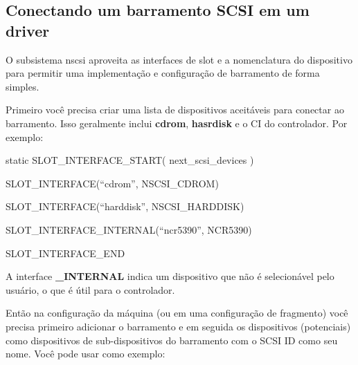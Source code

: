 \documentclass[letterpaper,10pt,brazil]{sphinxmanual}
\begin{document}
\subsection{Conectando um barramento SCSI em um driver}
\label{techspecs/nscsi:conectando-um-barramento-scsi-em-um-driver}
O subsistema nscsi aproveita as interfaces de slot e a nomenclatura do
dispositivo para permitir uma implementação e configuração de barramento
de forma simples.

Primeiro você precisa criar uma lista de dispositivos aceitáveis para
conectar ao barramento. Isso geralmente inclui \textbf{cdrom}, \textbf{hasrdisk} e
o CI do controlador.
Por exemplo:

\begin{DUlineblock}{0em}
\item[] 
\item[] static SLOT\_INTERFACE\_START( next\_scsi\_devices )
\item[]
\begin{DUlineblock}{\DUlineblockindent}
\item[] SLOT\_INTERFACE(``cdrom'', NSCSI\_CDROM)
\item[] SLOT\_INTERFACE(``harddisk'', NSCSI\_HARDDISK)
\item[] SLOT\_INTERFACE\_INTERNAL(``ncr5390'', NCR5390)
\end{DUlineblock}
\item[] SLOT\_INTERFACE\_END
\end{DUlineblock}

A interface \textbf{\_INTERNAL} indica um dispositivo que não é selecionável
pelo usuário, o que é útil para o controlador.

Então na configuração da máquina (ou em uma configuração de fragmento)
você precisa primeiro adicionar o barramento e em seguida os
dispositivos (potenciais) como dispositivos de sub-dispositivos do
barramento com o SCSI ID como seu nome. Você pode usar como exemplo:
\end{document}
